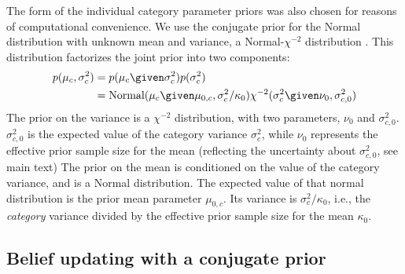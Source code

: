 The form of the individual category parameter priors was also chosen for reasons of computational convenience.  We use the conjugate prior for the Normal distribution with unknown mean and variance, a Normal-$\chi^{-2}$ distribution \autocite{Gelman2003}.  This distribution factorizes the joint prior into two components:
\begin{align}
  \label{eq:7}
  p(\mu_c, \sigma^2_c) &= p(\mu_c \given \sigma^2_c) p(\sigma^2_c)\\
  &= \mathrm{Normal} (\mu_c \given \mu_{0,c}, \sigma^2_c / \kappa_0) \chi^{-2} (\sigma^2_c \given \nu_0, \sigma^2_{c,0})
\end{align}
The prior on the variance is a $\chi^{-2}$ distribution, with two parameters, $\nu_0$ and $\sigma^2_{c,0}$.  $\sigma^2_{c,0}$  is the expected value of the category variance $\sigma^2_c$, while $\nu_0$ represents the effective prior sample size for the mean (reflecting the uncertainty about $\sigma^2_{c,0}$, see main text)%
The prior on the mean is conditioned on the value of the category variance, and is a Normal distribution. The expected value of that normal distribution is the prior mean parameter $\mu_{0,c}$. Its variance is $\sigma^2_c / \kappa_0$, i.e., the \emph{category} variance divided by the effective prior sample size for the mean $\kappa_0$.

\subsection{Belief updating with a conjugate prior}
\label{sec:belief-updating-with}

